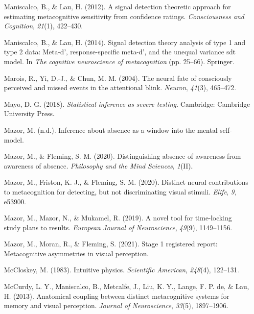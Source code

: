 \documentclass[12pt,twoside]{reedthesis}
\begin{document}
\leavevmode\hypertarget{ref-maniscalco2012signal}{}%
Maniscalco, B., \& Lau, H. (2012). A signal detection theoretic approach for estimating metacognitive sensitivity from confidence ratings. \emph{Consciousness and Cognition}, \emph{21}(1), 422--430.

\leavevmode\hypertarget{ref-maniscalco2014signal}{}%
Maniscalco, B., \& Lau, H. (2014). Signal detection theory analysis of type 1 and type 2 data: Meta-d', response-specific meta-d', and the unequal variance sdt model. In \emph{The cognitive neuroscience of metacognition} (pp. 25--66). Springer.

\leavevmode\hypertarget{ref-marois2004neural}{}%
Marois, R., Yi, D.-J., \& Chun, M. M. (2004). The neural fate of consciously perceived and missed events in the attentional blink. \emph{Neuron}, \emph{41}(3), 465--472.

\leavevmode\hypertarget{ref-mayo2018statistical}{}%
Mayo, D. G. (2018). \emph{Statistical inference as severe testing}. Cambridge: Cambridge University Press.

\leavevmode\hypertarget{ref-mazorinference}{}%
Mazor, M. (n.d.). Inference about absence as a window into the mental self-model.

\leavevmode\hypertarget{ref-mazor2020distinguishing}{}%
Mazor, M., \& Fleming, S. M. (2020). Distinguishing absence of awareness from awareness of absence. \emph{Philosophy and the Mind Sciences}, \emph{1}(II).

\leavevmode\hypertarget{ref-mazor2020distinct}{}%
Mazor, M., Friston, K. J., \& Fleming, S. M. (2020). Distinct neural contributions to metacognition for detecting, but not discriminating visual stimuli. \emph{Elife}, \emph{9}, e53900.

\leavevmode\hypertarget{ref-mazor2019novel}{}%
Mazor, M., Mazor, N., \& Mukamel, R. (2019). A novel tool for time-locking study plans to results. \emph{European Journal of Neuroscience}, \emph{49}(9), 1149--1156.

\leavevmode\hypertarget{ref-mazor2021stage}{}%
Mazor, M., Moran, R., \& Fleming, S. (2021). Stage 1 registered report: Metacognitive asymmetries in visual perception.

\leavevmode\hypertarget{ref-mccloskey1983intuitive}{}%
McCloskey, M. (1983). Intuitive physics. \emph{Scientific American}, \emph{248}(4), 122--131.

\leavevmode\hypertarget{ref-mccurdy2013anatomical}{}%
McCurdy, L. Y., Maniscalco, B., Metcalfe, J., Liu, K. Y., Lange, F. P. de, \& Lau, H. (2013). Anatomical coupling between distinct metacognitive systems for memory and visual perception. \emph{Journal of Neuroscience}, \emph{33}(5), 1897--1906.
\end{document}
